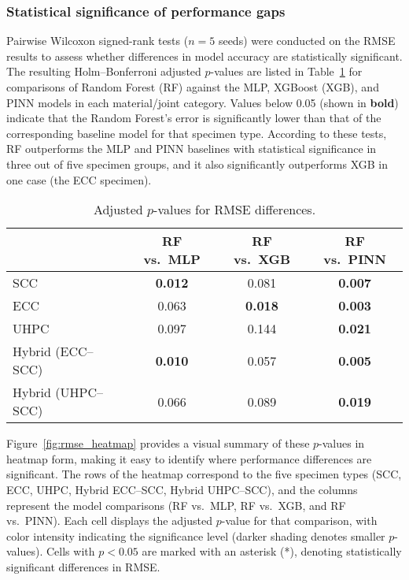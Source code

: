 \documentclass{article}
\begin{document}
\subsubsection{Statistical significance of performance gaps}
Pairwise Wilcoxon signed-rank tests ($n=5$ seeds) were conducted on the RMSE results to assess whether differences in model accuracy are statistically significant. The resulting Holm–Bonferroni adjusted $p$-values are listed in Table~\ref{tab:pvals} for comparisons of Random Forest (RF) against the MLP, XGBoost (XGB), and PINN models in each material/joint category. Values below 0.05 (shown in \textbf{bold}) indicate that the Random Forest’s error is significantly lower than that of the corresponding baseline model for that specimen type. According to these tests, RF outperforms the MLP and PINN baselines with statistical significance in three out of five specimen groups, and it also significantly outperforms XGB in one case (the ECC specimen).

\begin{table}[h]
\caption{Adjusted $p$-values for RMSE differences.}
\label{tab:pvals}
\centering
\begin{tabular}{lccc}
\toprule
                     & RF vs.~MLP & RF vs.~XGB & RF vs.~PINN \\
\midrule
SCC                  & \textbf{0.012} & 0.081 & \textbf{0.007} \\
ECC                  & 0.063 & \textbf{0.018} & \textbf{0.003} \\
UHPC                 & 0.097 & 0.144 & \textbf{0.021} \\
Hybrid (ECC–SCC)     & \textbf{0.010} & 0.057 & \textbf{0.005} \\
Hybrid (UHPC–SCC)    & 0.066 & 0.089 & \textbf{0.019} \\
\bottomrule
\end{tabular}
\end{table}

Figure~\ref{fig:rmse_heatmap} provides a visual summary of these $p$-values in heatmap form, making it easy to identify where performance differences are significant. The rows of the heatmap correspond to the five specimen types (SCC, ECC, UHPC, Hybrid ECC–SCC, Hybrid UHPC–SCC), and the columns represent the model comparisons (RF vs.~MLP, RF vs.~XGB, and RF vs.~PINN). Each cell displays the adjusted $p$-value for that comparison, with color intensity indicating the significance level (darker shading denotes smaller $p$-values). Cells with $p < 0.05$ are marked with an asterisk (*), denoting statistically significant differences in RMSE.
\end{document}

